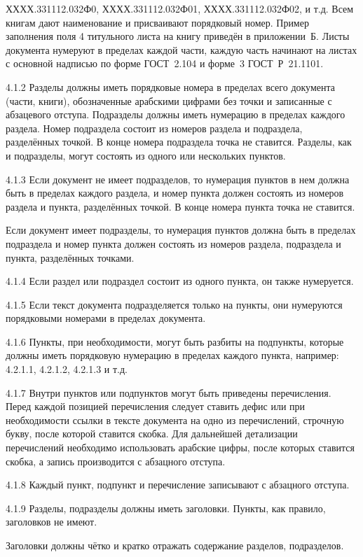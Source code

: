 ХХХХ.331112.032Ф0, ХХХХ.331112.032Ф01, ХХХХ.331112.032Ф02, и т.д. Всем книгам дают наименование
и присваивают порядковый номер. Пример заполнения поля 4 титульного листа на книгу приведён в приложении~Б.
Листы документа нумеруют в пределах каждой части, каждую часть начинают на листах с основной надписью по форме ГОСТ~2.104 и форме~3 ГОСТ~Р~21.1101.

4.1.2 Разделы должны иметь порядковые номера в пределах всего документа (части, книги), обозначенные арабскими цифрами без точки и записанные с абзацевого отступа. Подразделы должны иметь нумерацию в пределах каждого раздела. Номер подраздела состоит из номеров раздела и подраздела, разделённых точкой. В конце номера подраздела точка не ставится. Разделы, как и подразделы, могут состоять из одного или
нескольких пунктов.

4.1.3 Если документ не имеет подразделов, то нумерация пунктов в нем должна быть в пределах каждого раздела, и номер пункта должен состоять из номеров раздела и пункта, разделённых точкой. В конце номера пункта точка не ставится.

Если документ имеет подразделы, то нумерация пунктов должна быть в пределах подраздела и номер пункта должен состоять из номеров раздела, подраздела и пункта, разделённых точками.

4.1.4 Если раздел или подраздел состоит из одного пункта, он также нумеруется.

4.1.5 Если текст документа подразделяется только на пункты, они нумеруются порядковыми номерами в пределах документа.

4.1.6 Пункты, при необходимости, могут быть разбиты на подпункты, которые должны иметь порядковую нумерацию в пределах каждого пункта, например: 4.2.1.1, 4.2.1.2, 4.2.1.3 и т.д.

4.1.7 Внутри пунктов или подпунктов могут быть приведены перечисления.
Перед каждой позицией перечисления следует ставить дефис или при необходимости ссылки в тексте документа на одно из перечислений, строчную букву, после которой ставится скобка. Для дальнейшей детализации перечислений необходимо использовать арабские цифры, после которых ставится скобка, а запись производится с абзацного отступа.

4.1.8 Каждый пункт, подпункт и перечисление записывают с абзацного отступа.

4.1.9 Разделы, подразделы должны иметь заголовки. Пункты, как правило, заголовков не имеют.

Заголовки должны чётко и кратко отражать содержание разделов, подразделов.

